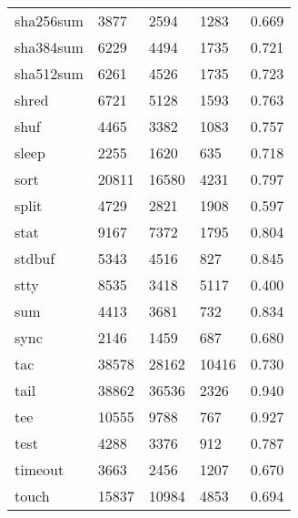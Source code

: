 \begin{longtable}{lp{4.5cm}p{4.5cm}p{4.5cm}p{4.5cm}}
sha256sum &                     3877 &         2594 &          1283 &                    0.669 \\
sha384sum &                     6229 &         4494 &          1735 &                    0.721 \\
sha512sum &                     6261 &         4526 &          1735 &                    0.723 \\
shred     &                     6721 &         5128 &          1593 &                    0.763 \\
shuf      &                     4465 &         3382 &          1083 &                    0.757 \\
sleep     &                     2255 &         1620 &           635 &                    0.718 \\
sort      &                    20811 &        16580 &          4231 &                    0.797 \\
split     &                     4729 &         2821 &          1908 &                    0.597 \\
stat      &                     9167 &         7372 &          1795 &                    0.804 \\
stdbuf    &                     5343 &         4516 &           827 &                    0.845 \\
stty      &                     8535 &         3418 &          5117 &                    0.400 \\
sum       &                     4413 &         3681 &           732 &                    0.834 \\
sync      &                     2146 &         1459 &           687 &                    0.680 \\
tac       &                    38578 &        28162 &         10416 &                    0.730 \\
tail      &                    38862 &        36536 &          2326 &                    0.940 \\
tee       &                    10555 &         9788 &           767 &                    0.927 \\
test      &                     4288 &         3376 &           912 &                    0.787 \\
timeout   &                     3663 &         2456 &          1207 &                    0.670 \\
touch     &                    15837 &        10984 &          4853 &                    0.694 \\

\end{longtable}
